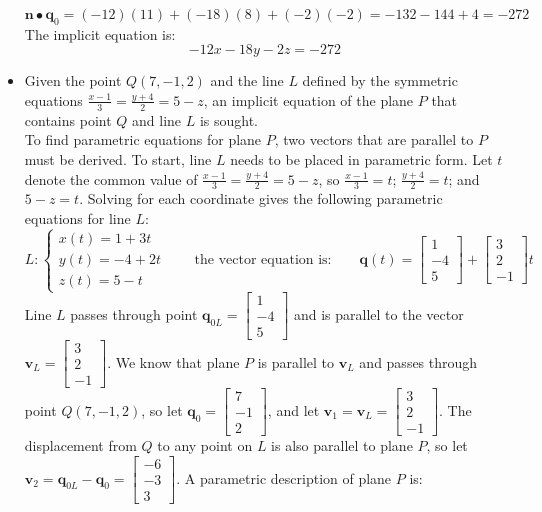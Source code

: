 \documentclass{article}
\begin{document}
\begin{itemize}
\(\mathbf{n} \bullet \mathbf{q}_0 = (-12)(11) + (-18)(8) + (-2)(-2) = -132 - 144 + 4 = -272\) \\ 
The implicit equation is:
\[-12x - 18y - 2z = -272\]
\item Given the point \(Q(7, -1, 2)\) and the line \(L\) defined by the symmetric equations \(\frac{x - 1}{3} = \frac{y + 4}{2} = 5 - z\), an implicit equation of the plane \(P\) that contains point \(Q\) and line \(L\) is sought. \\
To find parametric equations for plane \(P\), two vectors that are parallel to \(P\) must be derived. To start, line \(L\) needs to be placed in parametric form. Let \(t\) denote the common value of \(\frac{x - 1}{3} = \frac{y + 4}{2} = 5 - z\), so \(\frac{x - 1}{3} = t\); \(\frac{y + 4}{2} = t\); and \(5 - z = t\). Solving for each coordinate gives the following parametric equations for line \(L\): 
\[L: \left\{\begin{array}{c} x(t) = 1 + 3t \\ y(t) = -4 + 2t \\ z(t) = 5 - t \end{array}\right.
\quad\quad\text{the vector equation is:}\quad\quad
\mathbf{q}(t) = \begin{bmatrix} 1 \\ -4 \\ 5 \end{bmatrix} + \begin{bmatrix} 3 \\ 2 \\ -1 \end{bmatrix}t\]
Line \(L\) passes through point \(\mathbf{q}_{0L} = \begin{bmatrix} 1 \\ -4 \\ 5 \end{bmatrix}\) and is parallel to the vector \(\mathbf{v}_L = \begin{bmatrix} 3 \\ 2 \\ -1 \end{bmatrix}\). We know that plane \(P\) is parallel to \(\mathbf{v}_L\) and passes through point \(Q(7, -1, 2)\), so let \(\mathbf{q}_0 = \begin{bmatrix} 7 \\ -1 \\ 2 \end{bmatrix}\), and let \(\mathbf{v}_1 = \mathbf{v}_L = \begin{bmatrix} 3 \\ 2 \\ -1 \end{bmatrix}\). The displacement from \(Q\) to any point on \(L\) is also parallel to plane \(P\), so let \(\mathbf{v}_2 = \mathbf{q}_{0L} - \mathbf{q}_0 = \begin{bmatrix} -6 \\ -3 \\ 3 \end{bmatrix}\). A parametric description of plane \(P\) is:

\end{itemize}
\end{document}
